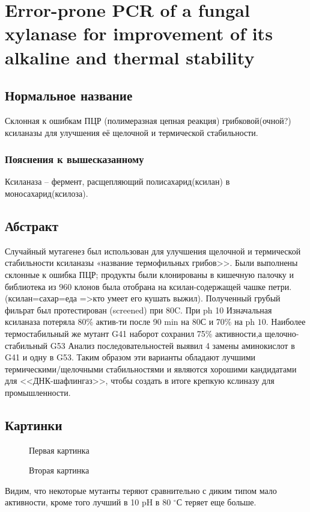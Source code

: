 \section{Error-prone PCR of a fungal xylanase for improvement of its alkaline and thermal stability}

\subsection{Нормальное название}

Склонная к ошибкам ПЦР (полимеразная цепная реакция) грибковой(очной?) ксиланазы для улучшения её щелочной и термической стабильности.

\subsubsection{Пояснения к вышесказанному}
Ксиланаза -- фермент, расщепляющий полисахарид(ксилан) в моносахарид(ксилоза).

\subsection{Абстракт}
Случайный мутагенез был использован для улучшения щелочной и термической стабильности ксиланазы «название термофильных грибов>>. Были выполнены склонные к ошибка ПЦР; продукты были клонированы в кишечную палочку и библиотека из 960 клонов была отобрана на ксилан-содержащей чашке петри. (ксилан=сахар=еда =>кто умеет его кушать выжил). Полученный грубый фильрат был протестирован (screened) при $80 \mathrm{C}$. При ph 10 Изначальная ксиланаза потеряла 80\% актив-ти после 90 min на 80С и 70\% на ph $10 .$ Наиболее термостабильный же мутант G41 наборот сохранил 75\% активности,а щелочно-стабильный G53 Анализ последовательностей выявил 4 замены аминокислот в G41 и одну в G53. Таким образом эти варианты обладают лучшими термическими/щелочными стабильностями и являются хорошими кандидатами для <<ДНК-шафлингаз>>, чтобы создать в итоге крепкую кслиназу для промышленности.

\subsection{Картинки}
\begin{figure}[H]\label{ul}
	\caption{Первая картинка}
\end{figure} 

\begin{figure}[H]\label{ul}
	\caption{Вторая картинка}
\end{figure} 
Видим, что некоторые мутанты теряют сравнительно с диким типом мало активности, кроме того лучший в 10 pH в 80 $^\circ$С теряет еще больше.

